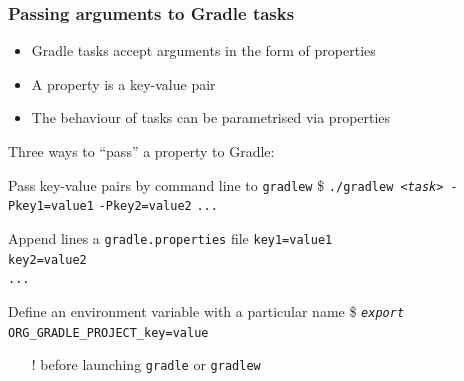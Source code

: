 \documentclass[presentation]{beamer}\mode<presentation>{\usetheme{AMSBolognaFC}}
\begin{document}
\begin{frame}[allowframebreaks]
\frametitle{Passing arguments to Gradle tasks}

    \begin{itemize}
        \item Gradle tasks accept arguments in the form of \alert{properties}
        \item A property is a \alert{key-value} pair
        \item The behaviour of tasks can be parametrised via properties
    \end{itemize}

    \framebreak

    

    \framebreak

    Three ways to ``pass'' a property to Gradle:

    \begin{block}{Pass key-value pairs by command line to \texttt{gradlew}}
        \centering
        \alert{\$} \texttt{./gradlew \textit{<task>} -P}\alert{\texttt{key1}}\texttt{=}\alert{\texttt{value1}} \texttt{-P}\alert{\texttt{key2}}\texttt{=}\alert{\texttt{value2}} \texttt{...}
    \end{block}

    \begin{block}{Append lines a \texttt{gradle.properties} file}
        \alert{\texttt{key1}}\texttt{=}\alert{\texttt{value1}}\\
        \alert{\texttt{key2}}\texttt{=}\alert{\texttt{value2}}\\
        \texttt{...}
    \end{block}

    \begin{block}{Define an environment variable with a particular name}
        \centering
        \alert{\$} \texttt{\textit{export} ORG\_GRADLE\_PROJECT\_\alert{key}=\alert{value}}
        \begin{itemize}
            \item[!] before launching \texttt{gradle} or \texttt{gradlew}
        \end{itemize}
    \end{block}

    \framebreak

    

\end{frame}
\end{document}
